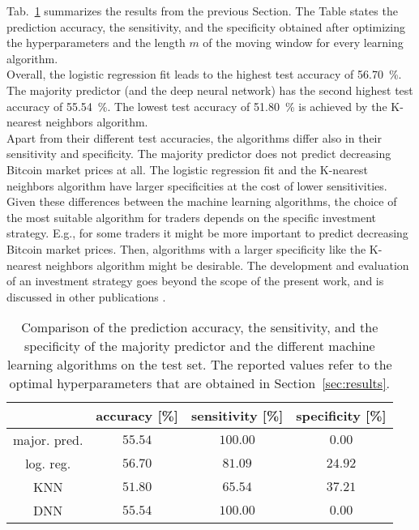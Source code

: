 Tab.~\ref{tab:comparison} summarizes the results from the previous Section. The Table states the prediction accuracy, the sensitivity, and the specificity obtained after optimizing the hyperparameters and the length $m$ of the moving window for every learning algorithm.\\

Overall, the logistic regression fit leads to the highest test accuracy of \SI{56.70}{\percent}. The majority predictor (and the deep neural network) has the second highest test accuracy of \SI{55.54}{\percent}. The lowest test accuracy of \SI{51.80}{\percent} is achieved by the K-nearest neighbors algorithm. \\

Apart from their different test accuracies, the algorithms differ also in their sensitivity and specificity. The majority predictor does not predict decreasing Bitcoin market prices at all. The logistic regression fit and the K-nearest neighbors algorithm have larger specificities at the cost of lower sensitivities.\\

Given these differences between the machine learning algorithms, the choice of the most suitable algorithm for traders depends on the specific investment strategy. E.g., for some traders it might be more important to predict decreasing Bitcoin market prices. Then, algorithms with a larger specificity like the K-nearest neighbors algorithm might be desirable. The development and evaluation of an investment strategy goes beyond the scope of the present work, and is discussed in other publications \cite{prediction_2019}\cite{prediction2_2019}.

\begin{table}[h!]
\centering
\begin{tabular}{c||c|c|c}
   & accuracy [\%] & sensitivity [\%] & specificity [\%] \\
   \hline
   \hline
major. pred. & $55.54$ & $100.00$ & $0.00$\\
\hline
log. reg. & $56.70$ & $81.09$ & $24.92$ \\ 
\hline
KNN & $51.80$ & $65.54$ & $37.21$ \\
\hline
DNN & $55.54$ & $100.00$ & $0.00$
\end{tabular}
 \caption{Comparison of the prediction accuracy, the sensitivity, and the specificity of the majority predictor and the different machine learning algorithms on the test set. The reported values refer to the optimal hyperparameters that are obtained in Section~\ref{sec:results}.}
 \label{tab:comparison}
\end{table}

